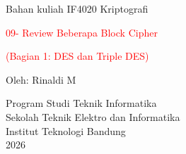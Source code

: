 \documentclass{article}
\begin{document}

\begin{center}
Bahan kuliah IF4020 Kriptografi

{\huge \textcolor{red}{09- Review Beberapa Block Cipher}}

{\Large \textcolor{red}{(Bagian 1: DES dan Triple DES)}}

\vspace{20mm}

Oleh: Rinaldi M

\vspace{10mm}

Program Studi Teknik Informatika\\
Sekolah Teknik Elektro dan Informatika\\
Institut Teknologi Bandung\\
2026
\end{center}
\end{document}
